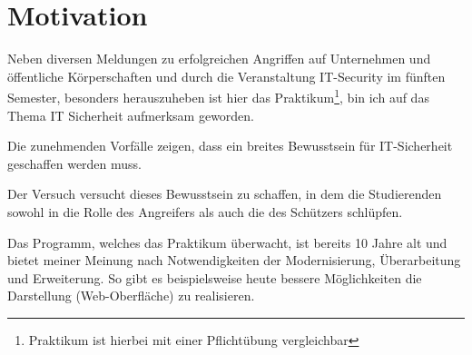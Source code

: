 \section{Motivation}
\label{sec:Motivation}
Neben diversen Meldungen zu erfolgreichen Angriffen auf Unternehmen und öffentliche Körperschaften und durch die Veranstaltung IT-Security im fünften Semester, besonders herauszuheben ist hier das Praktikum\footnote{Praktikum ist hierbei mit einer Pflichtübung vergleichbar}, bin ich auf das Thema IT Sicherheit aufmerksam geworden. 

Die zunehmenden Vorfälle zeigen, dass ein breites Bewusstsein für IT-Sicherheit geschaffen werden muss.

Der Versuch  versucht dieses Bewusstsein zu schaffen, in dem die Studierenden sowohl in die Rolle des Angreifers als auch die des Schützers schlüpfen.

Das Programm, welches das Praktikum überwacht, ist bereits 10 Jahre alt und bietet meiner Meinung nach Notwendigkeiten der Modernisierung, Überarbeitung und Erweiterung. 
So gibt es beispielsweise heute bessere Möglichkeiten die Darstellung (Web-Oberfläche) zu realisieren.